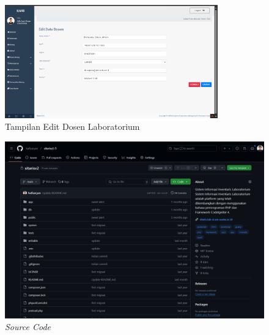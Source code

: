 \begin{figure}
	\centering
	\includegraphics[width=0.82\textwidth]{konten/gambar/hasil/edit-dosen.png}
	\caption{Tampilan Edit Dosen Laboratorium}
	\label{fig:edit-dosen}
\end{figure}

\begin{figure}
	\centering
	\includegraphics[width=0.82\linewidth]{konten/gambar/source-code.png}
	\caption{\textit{Source Code}}
	\label{fig:source-code}
\end{figure}